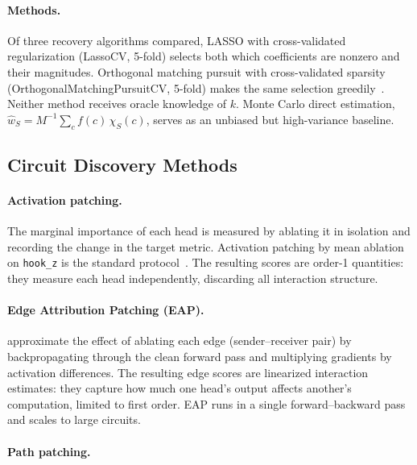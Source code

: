 \documentclass{article}
\begin{document}
\paragraph{Methods.}

Of three recovery algorithms compared, LASSO with cross-validated regularization (LassoCV, 5-fold) selects both which coefficients are nonzero
and their magnitudes. Orthogonal matching pursuit with cross-validated
sparsity (OrthogonalMatchingPursuitCV, 5-fold) makes the same selection
greedily~\citep{tropp2007signal}. Neither method receives oracle
knowledge of $k$. Monte Carlo
direct estimation, $\hat{w}_S = M^{-1} \sum_c f(c)\, \chi_S(c)$, serves as
an unbiased but high-variance baseline.


\subsection{Circuit Discovery Methods}
\label{sec:discovery-methods}

\paragraph{Activation patching.}

The marginal importance of each head is measured by ablating it in
isolation and recording the change in the target metric. Activation
patching by mean ablation on \texttt{hook\_z} is the standard
protocol~\citep{wang2022ioi}. The resulting scores are order-1
quantities: they measure each head independently, discarding all
interaction structure.

\paragraph{Edge Attribution Patching (EAP).}

\citet{syed2023attribution} approximate the effect of ablating each
edge (sender--receiver pair) by backpropagating through the clean
forward pass and multiplying gradients by activation differences. The
resulting edge scores are linearized interaction estimates: they
capture how much one head's output affects another's computation,
limited to first order. EAP runs in a single forward--backward pass and
scales to large circuits.

\paragraph{Path patching.}
\end{document}

